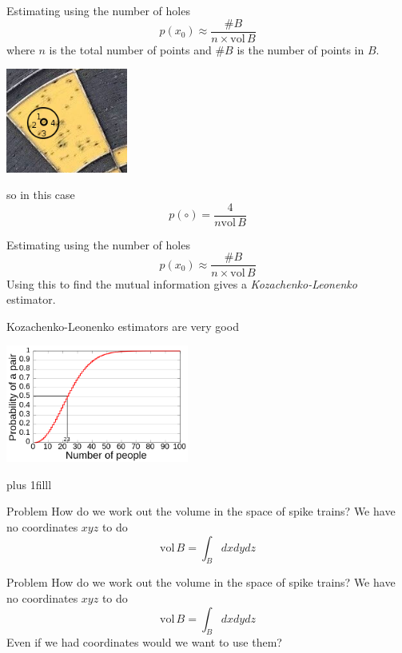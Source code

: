 \documentclass{beamer}
\newcommand{\btVFill}{\vskip0pt plus 1filll}
\begin{document}
\begin{frame}{Estimating using the number of holes}
\color{dark}
$$p(x_0)\approx\frac{\#B}{n\times \mbox{vol}\,B}
$$
\color{black}
where $n$ is the total number of points and $\#B$ is the number of points in $B$.
\color{reddish}
\begin{center}
\includegraphics[width=4cm]{dart_board_zoom_ball.png}
\end{center}
\color{black}
so in this case
\color{dark}
$$p(\circ)=\frac{4}{n\mbox{vol}\,B}$$
\end{frame}


\begin{frame}{Estimating using the number of holes}
\color{dark}
$$p(x_0)\approx\frac{\#B}{n\times \mbox{vol}\,B}$$
\color{black}
Using this to find the mutual information gives a \textsl{Kozachenko-Leonenko} estimator.
\end{frame}

\begin{frame}{Kozachenko-Leonenko estimators are very good}
\color{reddish}
\begin{center}
\includegraphics[width=6cm]{Birthday_Paradox.png}
\end{center}
\color{black}
\btVFill
\color{gray}
\color{black}
\end{frame}



\begin{frame}{Problem}
\color{black}
How do we work out the volume in the space of spike trains? We have no coordinates $xyz$ to do
\color{dark}
$$\mbox{vol}\,B=\int_B dxdydz$$
\end{frame}


\begin{frame}{Problem}
\color{black}
How do we work out the volume in the space of spike trains? We have no coordinates $xyz$ to do
\color{dark}
$$\mbox{vol}\,B=\int_B dxdydz$$
\color{black}
Even if we had coordinates would we want to use them?
\end{frame}
\end{document}
